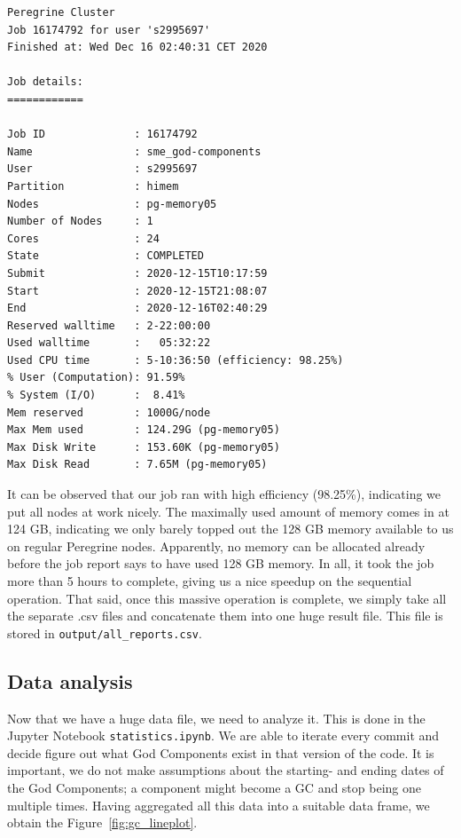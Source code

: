 \documentclass{article}
\begin{document}
\begin{lstlisting}[caption={Peregrine job output.}, label={code:peregrine-output}]
Peregrine Cluster
Job 16174792 for user 's2995697'
Finished at: Wed Dec 16 02:40:31 CET 2020

Job details:
============

Job ID              : 16174792
Name                : sme_god-components
User                : s2995697
Partition           : himem
Nodes               : pg-memory05
Number of Nodes     : 1
Cores               : 24
State               : COMPLETED
Submit              : 2020-12-15T10:17:59
Start               : 2020-12-15T21:08:07
End                 : 2020-12-16T02:40:29
Reserved walltime   : 2-22:00:00
Used walltime       :   05:32:22
Used CPU time       : 5-10:36:50 (efficiency: 98.25%)
% User (Computation): 91.59%
% System (I/O)      :  8.41%
Mem reserved        : 1000G/node
Max Mem used        : 124.29G (pg-memory05)
Max Disk Write      : 153.60K (pg-memory05)
Max Disk Read       : 7.65M (pg-memory05)
\end{lstlisting}

It can be observed that our job ran with high efficiency (98.25\%), indicating we put all nodes at work nicely. The maximally used amount of memory comes in at 124 GB, indicating we only barely topped out the 128 GB memory available to us on regular Peregrine nodes. Apparently, no memory can be allocated already before the job report says to have used 128 GB memory. In all, it took the job more than 5 hours to complete, giving us a nice speedup on the sequential operation. That said, once this massive operation is complete, we simply take all the separate .csv files and concatenate them into one huge result file. This file is stored in \texttt{output/all\_reports.csv}.

\subsection{Data analysis}
Now that we have a huge data file, we need to analyze it. This is done in the Jupyter Notebook \texttt{statistics.ipynb}. We are able to iterate every commit and decide figure out what God Components exist in that version of the code. It is important, we do not make assumptions about the starting- and ending dates of the God Components; a component might become a GC and stop being one multiple times. Having aggregated all this data into a suitable data frame, we obtain the Figure~\ref{fig:gc_lineplot}.
\end{document}
